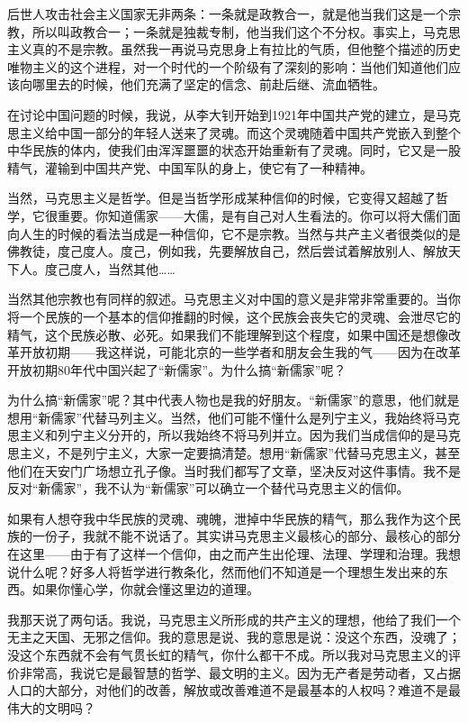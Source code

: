 \documentclass[UTF8, 12pt, a4paper]{ctexrep}
\begin{document}
后世人攻击社会主义国家无非两条：一条就是政教合一，就是他当我们这是一个宗教，所以叫政教合一；一条就是独裁专制，他当我们这个不分权。事实上，马克思主义真的不是宗教。虽然我一再说马克思身上有拉比的气质，但他整个描述的历史唯物主义的这个进程，对一个时代的一个阶级有了深刻的影响：当他们知道他们应该向哪里去的时候，他们充满了坚定的信念、前赴后继、流血牺牲。

在讨论中国问题的时候，我说，从李大钊开始到1921年中国共产党的建立，是马克思主义给中国一部分的年轻人送来了灵魂。而这个灵魂随着中国共产党嵌入到整个中华民族的体内，使我们由浑浑噩噩的状态开始重新有了灵魂。同时，它又是一股精气，灌输到中国共产党、中国军队的身上，使它有了一种精神。

当然，马克思主义是哲学。但是当哲学形成某种信仰的时候，它变得又超越了哲学，它很重要。你知道儒家——大儒，是有自己对人生看法的。你可以将大儒们面向人生的时候的看法当成是一种信仰，它不是宗教。当然与共产主义者很类似的是佛教徒，度己度人。度己，例如我，先要解放自己，然后尝试着解放别人、解放天下人。度己度人，当然其他……

当然其他宗教也有同样的叙述。马克思主义对中国的意义是非常非常重要的。当你将一个民族的一个基本的信仰推翻的时候，这个民族会丧失它的灵魂、会泄尽它的精气，这个民族必散、必死。如果我们不能理解到这个程度，如果中国还是想像改革开放初期——我这样说，可能北京的一些学者和朋友会生我的气——因为在改革开放初期80年代中国兴起了“新儒家”。为什么搞“新儒家”呢？

为什么搞“新儒家”呢？其中代表人物也是我的好朋友。“新儒家”的意思，他们就是想用“新儒家”代替马列主义。当然，他们可能不懂什么是列宁主义，我始终将马克思主义和列宁主义分开的，所以我始终不将马列并立。因为我们当成信仰的是马克思主义，不是列宁主义，大家一定要搞清楚。想用“新儒家”代替马克思主义，甚至他们在天安门广场想立孔子像。当时我们都写了文章，坚决反对这件事情。我不是反对“新儒家”，我不认为“新儒家”可以确立一个替代马克思主义的信仰。

如果有人想夺我中华民族的灵魂、魂魄，泄掉中华民族的精气，那么我作为这个民族的一份子，我就不能不说话了。其实讲马克思主义最核心的部分、最核心的部分在这里——由于有了这样一个信仰，由之而产生出伦理、法理、学理和治理。我想说什么呢？好多人将哲学进行教条化，然而他们不知道是一个理想生发出来的东西。如果你懂心学，你就会懂这里边的道理。

我那天说了两句话。我说，马克思主义所形成的共产主义的理想，他给了我们一个无主之天国、无邪之信仰。我的意思是说、我的意思是说：没这个东西，没魂了；没这个东西就不会有气贯长虹的精气，你什么都干不成。所以我对马克思主义的评价非常高，我说它是最智慧的哲学、最文明的主义。因为无产者是劳动者，又占据人口的大部分，对他们的改善，解放或改善难道不是最基本的人权吗？难道不是最伟大的文明吗？
\end{document}

